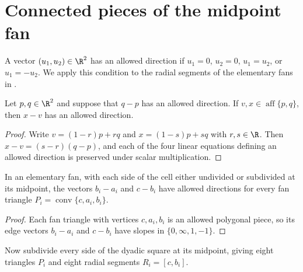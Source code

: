 \section{Connected pieces of the midpoint fan}
\label{sec:area_law_fan_pieces}

A vector $(u_1,u_2)\in\R^2$ has an allowed direction if
$u_1=0$, $u_2=0$, $u_1=u_2$, or $u_1=-u_2$.
We apply this condition to the radial segments of the elementary fans in
\cite[Section~11]{OpenAI2026AreaLaw}.

\begin{lemma}
    \label{thm:area_law_allowed_direction_affine_span}
    \leanok
    Let $p,q\in\R^2$ and suppose that $q-p$ has an allowed direction.
    If $v,x\in\operatorname{aff}\{p,q\}$, then $x-v$ has an allowed
    direction.
\end{lemma}
\begin{proof}\leanok
    Write $v=(1-r)p+rq$ and $x=(1-s)p+sq$ with $r,s\in\R$.
    Then $x-v=(s-r)(q-p)$, and each of the four linear equations defining
    an allowed direction is preserved under scalar multiplication.
\end{proof}

\begin{lemma}
    \label{thm:area_law_fan_base_radial_directions}
    \leanok
    In an elementary fan, with each side of the cell either undivided or
    subdivided at its midpoint, the vectors $b_i-a_i$ and $c-b_i$ have
    allowed directions for every fan triangle $P_i=\operatorname{conv}\{c,a_i,b_i\}$.
\end{lemma}
\begin{proof}\leanok
    Each fan triangle with vertices $c,a_i,b_i$ is an allowed polygonal piece,
    so its edge vectors $b_i-a_i$ and $c-b_i$ have slopes in
    $\{0,\infty,1,-1\}$.
\end{proof}

Now subdivide every side of the dyadic square at its midpoint, giving eight
triangles $P_i$ and eight radial segments $R_i=[c,b_i]$.

